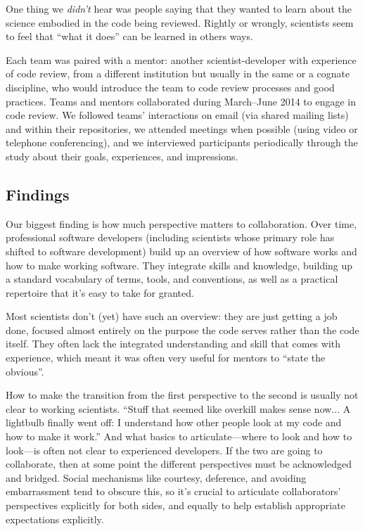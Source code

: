 \documentclass[10pt,twocolumn]{article}
\begin{document}
One thing we \emph{didn't} hear was people saying that
they wanted to learn about the science embodied in the code being reviewed.
Rightly or wrongly, scientists seem to feel that ``what it does'' can be learned in others ways.

Each team was paired with a mentor:
another scientist-developer with experience of code review,
from a different institution but usually in the same or a cognate discipline,
who would introduce the team to code review processes and good practices.
Teams and mentors collaborated during March--June 2014 to engage in code review.
We followed teams' interactions on email (via shared mailing lists)
and within their repositories,
we attended meetings when possible (using video or telephone conferencing),
and we interviewed participants periodically through the study about their goals, experiences, and impressions.

\subsection{Findings}

Our biggest finding is how much perspective matters to collaboration.
Over time,
professional software developers (including scientists whose primary role has shifted to software development)
build up an overview of how software works and how to make working software.
They integrate skills and knowledge,
building up a standard vocabulary of terms, tools, and conventions,
as well as a practical repertoire that it's easy to take for granted.

Most scientists don't (yet) have such an overview:
they are just getting a job done,
focused almost entirely on the purpose the code serves rather than the code itself.
They often lack the integrated understanding and skill that comes with experience,
which meant it was often very useful for mentors to ``state the obvious''.

How to make the transition from the first perspective to the second is usually not clear to working scientists.
``Stuff that seemed like overkill makes sense now...
A lightbulb finally went off: I understand how other people look at my code and how to make it work.''
And what basics to articulate---where to look and how to look---is often not clear to experienced developers.
If the two are going to collaborate, then at some point the different perspectives must be acknowledged and bridged.
Social mechanisms like courtesy, deference, and avoiding embarrassment tend to obscure this,
so it's crucial to articulate collaborators' perspectives explicitly for both sides,
and equally to help establish appropriate expectations explicitly.
\end{document}
